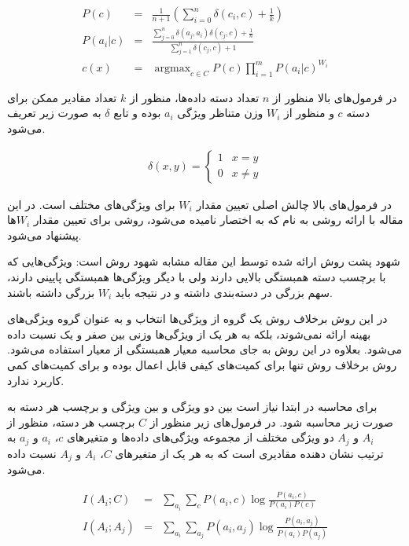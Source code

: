\documentclass[12pt, a4paper]{article}
\DeclareMathOperator*{\argmax}{argmax}
\begin{document}
\begin{eqnarray}
    P(c) & = & \frac{1}{n+1} (\sum_{i=0}^{n} \delta(c_i, c) + \frac{1}{k}) \\
    P(a_i|c) & = & \frac{\sum_{j=0}^{n} \delta(a_j, a_i) \delta(c_j, c) + \frac{1}{n}}{\sum_{j=1}^{n} \delta(c_j,c) + 1} \\
    c(x) & = & \argmax_{c \in C} P(c) \prod_{i=1}^{m} P(a_i|c)^{W_i} \label{bayes_classification_formula}
\end{eqnarray}

در فرمول‌های بالا منظور از $n$ تعداد دسته داده‌ها، منظور از $k$ تعداد مقادیر ممکن برای دسته $c$ و
منظور از $W_i$ وزن متناظر ویژگی $a_i$ بوده و تابع $\delta$ به صورت زیر تعریف می‌شود.

\begin{eqnarray}
    \delta(x, y) =
    \begin{cases}
        1 & x = y \\
        0 & x \neq y
    \end{cases}
\end{eqnarray}

در فرمول‌های بالا چالش اصلی تعیین مقدار $W_i$ برای
ویژگی‌های مختلف است. در این مقاله با ارائه روشی به نام  که به اختصار
 نامیده می‌شود، روشی برای تعیین مقدار $W_i$ها پیشنهاد می‌شود.

شهود پشت روش ارائه شده توسط این مقاله مشابه شهود روش  است:
ویژگی‌هایی که با برچسب دسته همبستگی بالایی دارند ولی با دیگر ویژگی‌‌ها همبستگی پایینی دارند، سهم بزرگی در دسته‌بندی داشته و در نتیجه
باید $W_i$ بزرگی داشته باشند.

در این روش برخلاف روش  یک گروه از ویژگی‌ها انتخاب و به عنوان گروه ویژگی‌های بهینه ارائه نمی‌شوند، بلکه به
هر یک از ویژگی‌ها وزنی بین صفر و یک نسبت داده می‌شود. بعلاوه در این روش به جای محاسبه معیار همبستگی از
معیار  استفاده می‌شود. روش  برخلاف روش  تنها برای کمیت‌های
کیفی قابل اعمال بوده و برای کمیت‌های کمی کاربرد ندارد.

برای محاسبه  در ابتدا نیاز است  بین دو ویژگی و بین ویژگی و برچسب هر دسته
به صورت زیر محاسبه شود. در فرمول‌های زیر منظور از $C$ برچسب هر دسته،
منظور از $A_i$ و $A_j$ دو ویژگی مختلف از مجموعه ویژگی‌های
داده‌ها و متغیر‌های $c$، $a_i$ و $a_j$ به ترتیب نشان دهنده مقادیری است که به هر یک از متغیر‌های $C$،
$A_i$ و $A_j$ نسبت داده می‌شود.

\begin{eqnarray}
    I(A_i; C) & = & \sum_{a_i}\sum_{c} P(a_i, c) \log\frac{P(a_i, c)}{P(a_i)P(c)} \\
    I(A_i; A_j) & = & \sum_{a_i}\sum_{a_j} P(a_i, a_j) \log \frac{P(a_i, a_j)}{P(a_i) P(a_j)}
\end{eqnarray}
\end{document}
